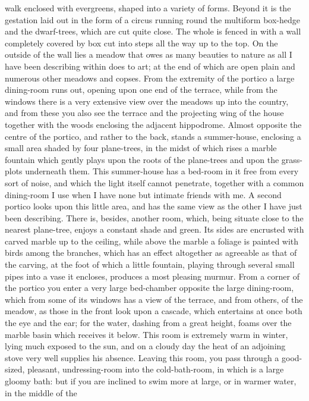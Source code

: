 walk enclosed with evergreens, shaped into a variety of forms. Beyond it
is the gestation laid out in the form of a circus running round the
multiform box-hedge and the dwarf-trees, which are cut quite close. The
whole is fenced in with a wall completely covered by box cut into steps
all the way up to the top. On the outside of the wall lies a meadow that
owes as many beauties to nature as all I have been describing within does
to art; at the end of which are open plain and numerous other meadows and
copses. From the extremity of the portico a large dining-room runs out,
opening upon one end of the terrace, while from the windows there is a
very extensive view over the meadows up into the country, and from these
you also see the terrace and the projecting wing of the house together
with the woods enclosing the adjacent hippodrome. Almost opposite the
centre of the portico, and rather to the back, stands a summer-house,
enclosing a small area shaded by four plane-trees, in the midst of which
rises a marble fountain which gently plays upon the roots of the
plane-trees and upon the grass-plots underneath them. This summer-house
has a bed-room in it free from every sort of noise, and which the light
itself cannot penetrate, together with a common dining-room I use when I
have none but intimate friends with me. A second portico looks upon this
little area, and has the same view as the other I have just been
describing. There is, besides, another room, which, being situate close to
the nearest plane-tree, enjoys a constant shade and green. Its sides are
encrusted with carved marble up to the ceiling, while above the marble a
foliage is painted with birds among the branches, which has an effect
altogether as agreeable as that of the carving, at the foot of which a
little fountain, playing through several small pipes into a vase it
encloses, produces a most pleasing murmur. From a corner of the portico
you enter a very large bed-chamber opposite the large dining-room, which
from some of its windows has a view of the terrace, and from others, of
the meadow, as those in the front look upon a cascade, which entertains at
once both the eye and the ear; for the water, dashing from a great height,
foams over the marble basin which receives it below. This room is
extremely warm in winter, lying much exposed to the sun, and on a cloudy
day the heat of an adjoining stove very well supplies his absence. Leaving
this room, you pass through a good-sized, pleasant, undressing-room into
the cold-bath-room, in which is a large gloomy bath: but if you are
inclined to swim more at large, or in warmer water, in the middle of the
